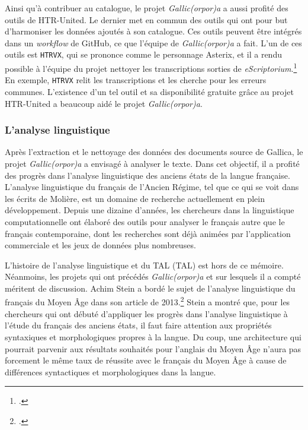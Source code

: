 \documentclass[class=article, crop=false]{standalone}
\begin{document}
Ainsi qu'à contribuer au catalogue, le projet \textit{Gallic(orpor)a} a aussi profité des outils de \Gls{HTR-United}. Le dernier met en commun des outils qui ont pour but d'harmoniser les données ajoutés à son catalogue. Ces outils peuvent être intégrés dans un \textit{workflow} de GitHub, ce que l'équipe de \textit{Gallic(orpor)a} a fait. L'un de ces outils est \texttt{HTRVX}, qui se prononce comme le personnage Asterix, et il a rendu possible à l'équipe du projet nettoyer les transcriptions sorties de \textit{eScriptorium}.\footcite{clericeHTRVXHTRValidation2021} En exemple, \texttt{HTRVX} relit les transcriptions et les cherche pour les erreurs communes. L'existence d'un tel outil et sa disponibilité gratuite grâce au projet \Gls{HTR-United} a beaucoup aidé le projet \textit{Gallic(orpor)a}.

\subsubsection{L'analyse linguistique}
Après l'extraction et le nettoyage des données des documents source de Gallica, le projet \textit{Gallic(orpor)a} a envisagé à analyser le texte. Dans cet objectif, il a profité des progrès dans l'analyse linguistique des anciens états de la langue française. L'analyse linguistique du français de l'Ancien Régime, tel que ce qui se voit dans les écrits de Molière, est un domaine de recherche actuellement en plein développement. Depuis une dizaine d'années, les chercheurs dans la linguistique computationnelle ont élaboré des outils pour analyser le français autre que le français contemporaine, dont les recherches sont déjà animées par l'application commerciale et les jeux de données plus nombreuses.

L'histoire de l'analyse linguistique et du \acrlong{TAL} (\acrshort{TAL}) est hors de ce mémoire. Néanmoins, les projets qui ont précédés \textit{Gallic(orpor)a} et sur lesquels il a compté méritent de discussion. Achim Stein a bordé le sujet de l'analyse linguistique du français du Moyen Âge dans son article de 2013.\footcite{steinSyntacticAnnotationMedieval2013} Stein a montré que, pour les chercheurs qui ont débuté d'appliquer les progrès dans l'analyse linguistique à l'étude du français des anciens états, il faut faire attention aux propriétés syntaxiques et morphologiques propres à la langue. Du coup, une architecture qui pourrait parvenir aux résultats souhaités pour l'anglais du Moyen Âge n'aura pas forcement le même taux de réussite avec le français du Moyen Âge à cause de différences syntactiques et morphologiques dans la langue.
\end{document}

